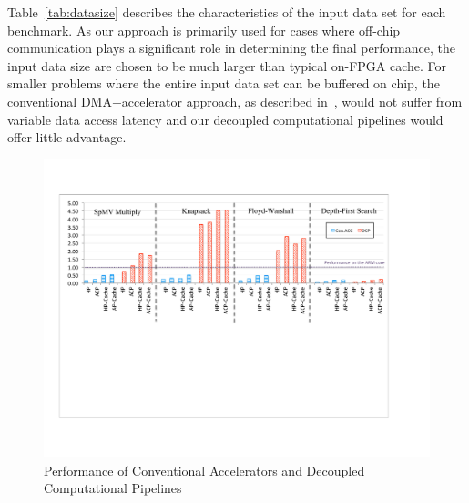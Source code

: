 Table~\ref{tab:datasize} describes the characteristics of the input data set for each
benchmark. 
As our approach is primarily used for cases where off-chip communication plays a
significant role in determining the final performance, the input data size are chosen
to be much larger than typical on-FPGA cache. For smaller problems where the
entire input data set can be buffered on chip, the conventional DMA+accelerator approach,
as described in~\cite{vivado_hls:appnoteMMult}, would not suffer from variable data access
latency and our decoupled computational pipelines would offer little advantage.




\begin{figure}[htp]
\begin{center}
\includegraphics[width=1.0\linewidth]{chap3fig/thesis_perf.pdf}
\caption{Performance of Conventional Accelerators and Decoupled Computational Pipelines
\label{fig:acpraw}}
\end{center}
\end{figure}



